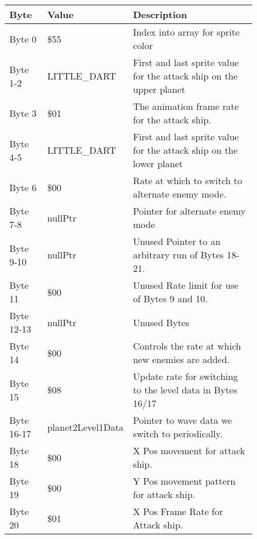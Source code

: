 \begin{figure}[H]
  {
  \setlength{\tabcolsep}{3.0pt}
  \setlength\cmidrulewidth{\heavyrulewidth} %
  \begin{adjustbox}{width=12cm}

\begin{tabular}{lll}
\toprule
 Byte       & Value             & Description                                                         \\
\midrule
 Byte 0     & \$55               & Index into array for sprite color                                   \\
 Byte 1-2   & LITTLE\_DART       & First and last sprite value for the attack ship on the upper planet \\
 Byte 3     & \$01               & The animation frame rate for the attack ship.                       \\
 Byte 4-5   & LITTLE\_DART       & First and last sprite value for the attack ship on the lower planet \\
 Byte 6     & \$00               & Rate at which to switch to alternate enemy mode.                    \\
 Byte 7-8   & nullPtr           & Pointer for alternate enemy mode                                    \\
 Byte 9-10  & nullPtr           & Unused Pointer to an arbitrary run of Bytes 18-21.                  \\
 Byte 11    & \$00               & Unused Rate limit for use of Bytes 9 and 10.                        \\
 Byte 12-13 & nullPtr           & Unused Bytes                                                        \\
 Byte 14    & \$00               & Controls the rate at which new enemies are added.                   \\
 Byte 15    & \$08               & Update rate for switching to the level data in Bytes 16/17          \\
 Byte 16-17 & planet2Level1Data & Pointer to wave data we switch to periodically.                     \\
 Byte 18    & \$00               & X Pos movement for attack ship.                                     \\
 Byte 19    & \$00               & Y Pos movement pattern for attack ship.                             \\
 Byte 20    & \$01               & X Pos Frame Rate for Attack ship.                                   \\

\end{tabular}
\end{adjustbox}}
\end{figure}

